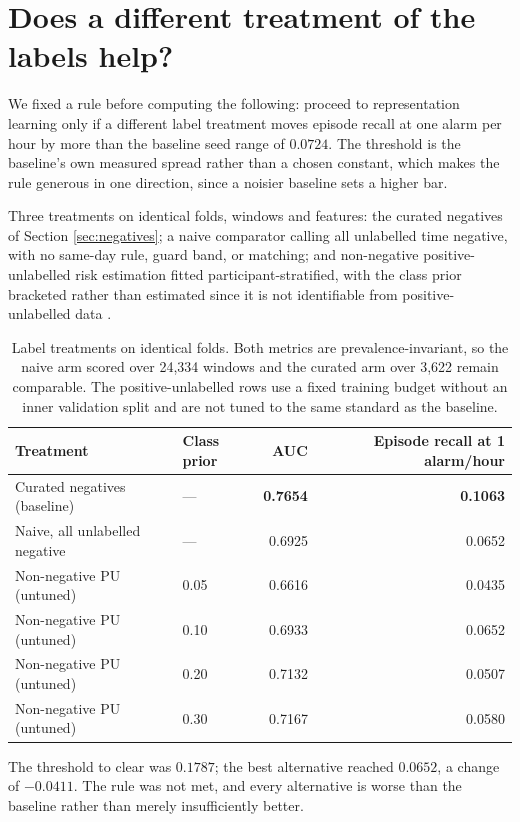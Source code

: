 \documentclass{article}
\begin{document}
\section{Does a different treatment of the labels help?}
\label{sec:pu}

We fixed a rule before computing the following: proceed to representation
learning only if a different label treatment moves episode recall at one alarm
per hour by more than the baseline seed range of $0.0724$. The threshold is the
baseline's own measured spread rather than a chosen constant, which makes the
rule generous in one direction, since a noisier baseline sets a higher bar.

Three treatments on identical folds, windows and features: the curated
negatives of Section \ref{sec:negatives}; a naive comparator calling all
unlabelled time negative, with no same-day rule, guard band, or matching; and
non-negative positive-unlabelled risk estimation \cite{kiryo2017} fitted
participant-stratified, with the class prior bracketed rather than estimated
since it is not identifiable from positive-unlabelled data \cite{elkan2008}.

\begin{table}[t]
\caption{Label treatments on identical folds. Both metrics are
prevalence-invariant, so the naive arm scored over 24{,}334 windows and the
curated arm over 3{,}622 remain comparable. The positive-unlabelled rows use a
fixed training budget without an inner validation split and are not tuned to
the same standard as the baseline.}
\label{tab:pu}
\centering
\begin{tabular}{llrr}
\toprule
Treatment & Class prior & AUC & Episode recall at 1 alarm/hour \\
\midrule
Curated negatives (baseline) & --- & \textbf{0.7654} & \textbf{0.1063} \\
Naive, all unlabelled negative & --- & 0.6925 & 0.0652 \\
Non-negative PU (untuned) & 0.05 & 0.6616 & 0.0435 \\
Non-negative PU (untuned) & 0.10 & 0.6933 & 0.0652 \\
Non-negative PU (untuned) & 0.20 & 0.7132 & 0.0507 \\
Non-negative PU (untuned) & 0.30 & 0.7167 & 0.0580 \\
\bottomrule
\end{tabular}
\end{table}

The threshold to clear was $0.1787$; the best alternative reached $0.0652$, a
change of $-0.0411$. The rule was not met, and every alternative is
worse than the baseline rather than merely insufficiently better.
\end{document}
